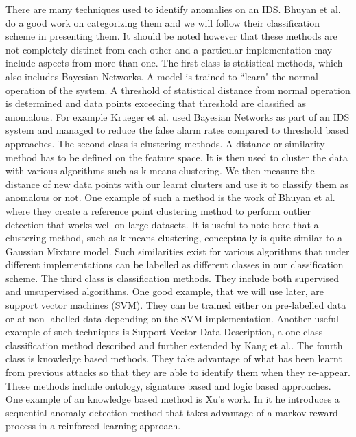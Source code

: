\documentclass[reqno,openany,12pt]{amsbook}
\begin{document}
There are many techniques used to identify anomalies on an IDS. Bhuyan et al.\cite{ids1} do a good work on categorizing them and we will follow their classification scheme in presenting them. It should be noted however that these methods are not completely distinct from each other and a particular implementation may include aspects from more than one.
The first class is statistical methods,
which also includes Bayesian Networks. A model is trained to ``learn" the normal operation of the system. A threshold of statistical distance from normal operation is determined and data points exceeding that threshold are classified as anomalous. For example Krueger et al.\cite{meth1} used Bayesian Networks as part of an IDS system and managed to reduce the false alarm rates compared to threshold based approaches.
The second class is clustering methods.
A distance or similarity method has to be defined on the feature space. It is then used to cluster the data with various algorithms such as k-means clustering. We then measure the distance of new data points with our learnt clusters
and use it to classify them as anomalous or not. One example of such a method is the work of Bhuyan et al.\cite{meth2} where they create a reference point clustering method to perform outlier detection that works well on large datasets. It is useful to note here that a clustering method, such as k-means clustering, conceptually is quite similar to a Gaussian Mixture model. Such similarities exist for various algorithms that under different implementations can be labelled as different classes in our classification scheme. 
The third class is classification methods.
They include both supervised and unsupervised algorithms. One good example, that we will use later, are support vector machines (SVM). They can be trained either on pre-labelled data or at non-labelled data depending on the SVM implementation. Another useful example of such techniques is Support Vector Data Description, a one class classification method described and further extended by Kang et al.\cite{meth3}.
The fourth class is knowledge based methods.
They take advantage of what has been learnt from previous attacks so that they are able to identify them when they re-appear. These methods include ontology, signature based and logic based approaches. One example of an knowledge based method is Xu's\cite{meth4} work. In it he introduces a sequential anomaly detection method that takes advantage of a markov reward process in a reinforced learning approach.
\end{document}
